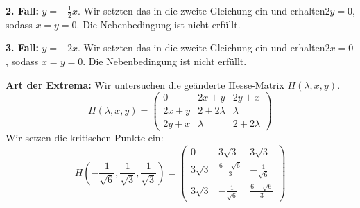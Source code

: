 \documentclass[a4paper, landscape,twocolumn,fontsize=9pt]{scrartcl}
\renewcommand{\hline}{\noindent\makebox[\linewidth]{\rule{12cm}{1pt}}}
\begin{document}
\textbf{2. Fall:} $y = -\frac{1}{2}x$. Wir setzten das in die zweite Gleichung ein und erhalten$2y = 0$, sodass $x = y = 0$. Die Nebenbedingung ist nicht erfüllt.

\textbf{3. Fall:} $y = -2x$. Wir setzten das in die zweite Gleichung ein und erhalten$2x = 0$, sodass $x = y = 0$. Die Nebenbedingung ist nicht erfüllt.

\hline 

\textbf{Art der Extrema:} Wir untersuchen die geänderte Hesse-Matrix $H(\lambda, x,y)$.
\[
	H(\lambda, x,y) = \begin{pmatrix}
		0 & 2x + y & 2y + x \\
		 2x + y & 2 + 2 \lambda & \lambda \\
		 2y +x & \lambda & 2 + 2\lambda
	\end{pmatrix}
\]
Wir setzen die kritischen Punkte ein:
\[
	H(-\frac{1}{\sqrt 6}, \frac{1}{\sqrt 3},\frac{1}{\sqrt 3}) = \begin{pmatrix}
		0 & 3\sqrt 3 & 3 \sqrt 3 \\
		 3\sqrt 3 & \frac{6-\sqrt 6}{3} & -\frac{1}{\sqrt 6} \\
		 3\sqrt 3 & -\frac{1}{\sqrt 6} & \frac{6-\sqrt 6}{3}
	\end{pmatrix}
\]
\end{document}
